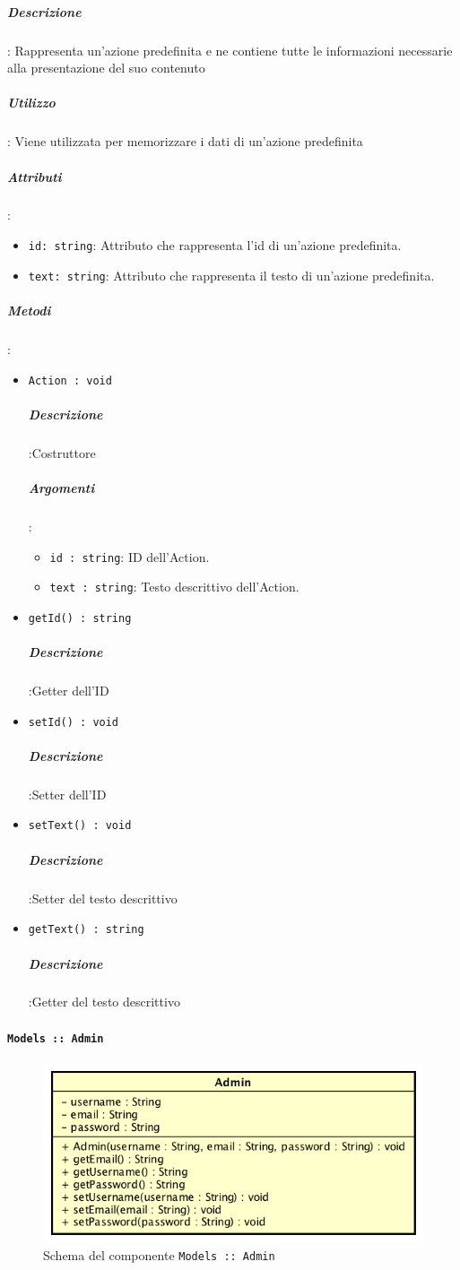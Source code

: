 \documentclass[../DefinizioneDiProdotto_v2.0.0.tex]{subfiles}
\begin{document}
		\subparagraph{Descrizione}: Rappresenta un'azione predefinita e ne contiene tutte le informazioni necessarie alla presentazione del suo contenuto
		\subparagraph{Utilizzo}: Viene utilizzata per memorizzare i dati di un'azione predefinita
		\subparagraph{Attributi}:
		      \begin{itemize}
		      	\item \texttt{id: string}:
		      	      Attributo che rappresenta l'id di un'azione predefinita.
		      	\item \texttt{text: string}:
		      	      Attributo che rappresenta il testo di un'azione predefinita.
		      \end{itemize}
		\subparagraph{Metodi}:
		      \begin{itemize}
		      	\item \texttt{Action : void}
		      	      \subparagraph{Descrizione}:Costruttore
					\subparagraph{Argomenti}:
						\begin{itemize}
							\item \texttt{id : string}:
								ID dell'Action.
							\item \texttt{text : string}:
								Testo descrittivo dell'Action.
						\end{itemize}

		      	\item \texttt{getId() : string}
		      	      \subparagraph{Descrizione}:Getter dell'ID

		      	\item \texttt{setId() : void}
		      	      \subparagraph{Descrizione}:Setter dell'ID

		      	\item \texttt{setText() : void}
		      	      \subparagraph{Descrizione}:Setter del testo descrittivo

		      	\item \texttt{getText() : string}
		      	      \subparagraph{Descrizione}:Getter del testo descrittivo
		      \end{itemize}



	\newpage
	\paragraph{\texttt{Models :: Admin}}
	\acapo
	\begin{figure}[!h]
		\centering
		\includegraphics[scale=0.6]{Architettura/Front-End/Models/Admin.png}
		\caption{Schema del componente \texttt{Models :: Admin}}
	\end{figure}
\end{document}
